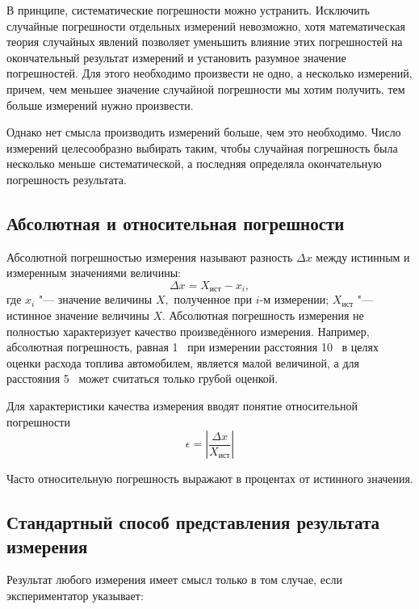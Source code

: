 \documentclass[a4paper, 12pt]{extarticle}
\newcommand{\eps}{\epsilon}
\begin{document}
В принципе, систематические погрешности можно устранить. Исключить случайные погрешности отдельных измерений невозможно, хотя математическая теория случайных явлений позволяет уменьшить влияние этих погрешностей на окончательный результат измерений и установить разумное значение погрешностей. Для этого необходимо произвести не одно, а несколько измерений, причем, чем меньшее значение случайной погрешности мы хотим получить, тем больше измерений нужно произвести.

Однако нет смысла производить измерений больше, чем это необходимо. Число измерений целесообразно выбирать таким, чтобы случайная погрешность была несколько меньше систематической, а последняя определяла окончательную погрешность результата.

\subsection {Абсолютная и относительная погрешности}
Абсолютной погрешностью измерения называют разность $\Delta x$ между
истинным и измеренным значениями величины:
\begin{equation}
\label{eq:abs-error}
\Delta x = X_{\text{ист}} - x_i,
\end{equation}
где $x_i$ "--- значение величины $X,$ полученное при $i$-м измерении; $X_{\text{ист}}$ "--- истинное значение величины $X.$
Абсолютная погрешность измерения не полностью характеризует
качество произведённого измерения. Например, абсолютная погрешность, равная 1~ %
при измерении расстояния 10~ в целях оценки расхода топлива автомобилем, является малой величиной, а для расстояния 5~ может
считаться только грубой оценкой.

Для характеристики качества измерения вводят понятие относительной погрешности
\begin{equation}
\label{eq:rel-error}
\eps = \left| \frac{\Delta x}{X_{\text{ист}}}\right|
\end{equation}

Часто относительную погрешность выражают в процентах от истинного значения.

\subsection{Стандартный способ представления результата измерения}

Результат любого измерения имеет смысл только в том случае, если экспериментатор указывает:
\end{document}
